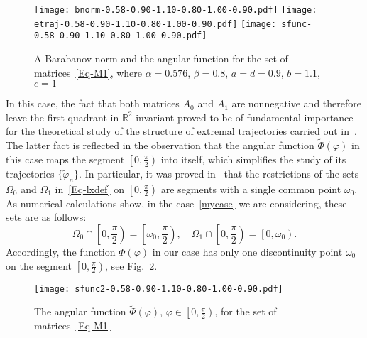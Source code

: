 \documentclass[a4paper,10pt,reqno]{amsart}
\let\cite\citep
\begin{document}
\begin{figure}[htbp!]
\centering \mbox{}\hfill{}
{\texttt{[image: bnorm-0.58-0.90-1.10-0.80-1.00-0.90.pdf]}}
\hfill{}
{\texttt{[image: etraj-0.58-0.90-1.10-0.80-1.00-0.90.pdf]}}
\hfill{}
{\texttt{[image: sfunc-0.58-0.90-1.10-0.80-1.00-0.90.pdf]}}
\hfill\mbox{} \caption{A Barabanov norm and the angular function for the set
of matrices~\eqref{Eq-M1}, where $\alpha=0.576$, $\beta=0.8$, $a=d=0.9$,
$b=1.1$, $c=1$}\label{F:0}
\end{figure}

In this case, the fact that both matrices $A_{0}$ and $A_{1}$ are nonnegative
and therefore leave the first quadrant in $\mathbb{R}^{2}$ invariant proved
to be of fundamental importance for the theoretical study of the structure of
extremal trajectories carried out in~\cite{Koz:INFOPROC05:e,
Koz:INFOPROC06:e}. The latter fact is reflected in the observation that the
angular function $\tilde{\varPhi}(\varphi)$ in this case maps the segment
$\left[0,\frac{\pi}{2}\right)$ into itself, which simplifies the study of its
trajectories $\{\tilde{\varphi}_{n}\}$. In particular, it was proved
in~\cite{Koz:INFOPROC05:e, Koz:INFOPROC06:e} that the restrictions of the
sets $\Omega_{0}$ and $\Omega_{1}$ in~\eqref{Eq-lxdef} on
$\left[0,\frac{\pi}{2}\right)$ are segments with a single common point
$\omega_{0}$. As numerical calculations show, in the case~\eqref{mycase} we
are considering, these sets are as follows:
\[\textstyle
\Omega_{0}\cap\left[0,\frac{\pi}{2}\right)=\left[\omega_{0},\frac{\pi}{2}\right),\quad
\Omega_{1}\cap\left[0,\frac{\pi}{2}\right)=\left[0,\omega_{0}\right).
\]
Accordingly, the function $\tilde{\varPhi}(\varphi)$ in our case has only one
discontinuity point $\omega_{0}$ on the segment
$\left[0,\frac{\pi}{2}\right)$, see Fig.~\ref{F:01}.

\begin{figure}[htbp!]
\centering
\texttt{[image: sfunc2-0.58-0.90-1.10-0.80-1.00-0.90.pdf]}
\caption{The angular function $\tilde{\varPhi}(\varphi)$,
$\varphi\in\left[0,\frac{\pi}{2}\right)$, for the set of
matrices~\eqref{Eq-M1}}\label{F:01}
\end{figure}
\end{document}
